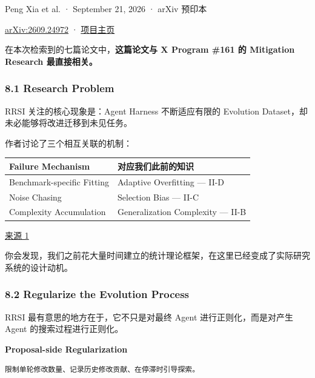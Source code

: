 Peng Xia et al. · September 21, 2026 · arXiv 预印本

\href{https://arxiv.org/abs/2609.24972}{arXiv:2609.24972} · \href{https://regularized-rsi.com/}{项目主页}

在本次检索到的七篇论文中，\textbf{这篇论文与 X Program \#161 的 Mitigation Research 最直接相关。}

\hypertarget{part-3-44-0001-research-problem}{%
\subsubsection{8.1 Research Problem}\label{part-3-44-0001-research-problem}}

RRSI 关注的核心现象是：Agent Harness 不断适应有限的 Evolution Dataset，却未必能够将改进迁移到未见任务。

作者讨论了三个相互关联的机制：

\begin{readertable}
\begin{longtable}[]{@{}
  >{\raggedright\arraybackslash}p{}
  >{\raggedright\arraybackslash}p{}@{}}
\toprule
Failure Mechanism & 对应我们此前的知识 \\
\midrule
\endhead
Benchmark-specific Fitting & Adaptive Overfitting --- II-D \\
Noise Chasing & Selection Bias --- II-C \\
Complexity Accumulation & Generalization Complexity --- II-B \\
\bottomrule
\end{longtable}
\end{readertable}

\href{https://arxiv.org/html/2609.24972v1}{来源 1}

你会发现，我们之前花大量时间建立的统计理论框架，在这里已经变成了实际研究系统的设计动机。

\hypertarget{part-3-44-0001-regularize-the-evolution-process}{%
\subsubsection{8.2 Regularize the Evolution Process}\label{part-3-44-0001-regularize-the-evolution-process}}

RRSI 最有意思的地方在于，它不只是对最终 Agent 进行正则化，而是对产生 Agent 的搜索过程进行正则化。

\textbf{Proposal-side Regularization}

\begin{verbatim}
限制单轮修改数量、记录历史修改贡献、在停滞时引导探索。
\end{verbatim}

